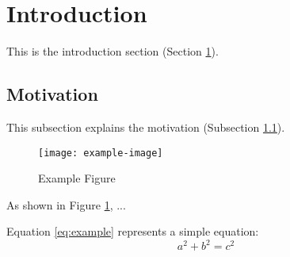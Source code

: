 \documentclass{article}
\begin{document}
\section{Introduction}\label{sec:intro}
This is the introduction section (Section \ref{sec:intro}).

\subsection{Motivation}\label{subsec:motivation}
This subsection explains the motivation (Subsection \ref{subsec:motivation}).

\begin{figure}[htbp]
    \centering
    \texttt{[image: example-image]} %
    \caption{Example Figure}\label{fig:example}
\end{figure}

As shown in Figure \ref{fig:example}, ...

Equation \ref{eq:example} represents a simple equation:
\begin{equation}
    a^2 + b^2 = c^2 \label{eq:example}
\end{equation}
\end{document}
